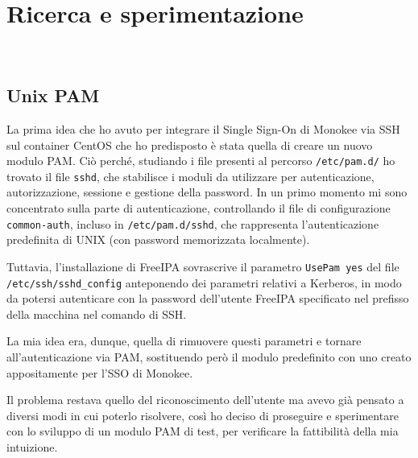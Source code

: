 
\chapter{Ricerca e sperimentazione}
\label{cap:ricerca-sperimentazione}

\\

\section{Unix PAM}
\label{sec:tecnologie-strumenti}

La prima idea che ho avuto per integrare il Single Sign-On di Monokee via SSH sul container CentOS che ho predisposto è stata quella di creare un nuovo modulo PAM. Ciò perché, studiando i file presenti al percorso \texttt{/etc/pam.d/} ho trovato il file \texttt{sshd}, che stabilisce i moduli da utilizzare per autenticazione, autorizzazione, sessione e gestione della password. In un primo momento mi sono concentrato sulla parte di autenticazione, controllando il file di configurazione \texttt{common-auth}, incluso in \texttt{/etc/pam.d/sshd}, che rappresenta l'autenticazione predefinita di UNIX (con password memorizzata localmente). 

Tuttavia, l'installazione di FreeIPA sovrascrive il parametro \texttt{UsePam yes} del file \texttt{/etc/ssh/sshd\_config} anteponendo dei parametri relativi a Kerberos, in modo da potersi autenticare con la password dell'utente FreeIPA specificato nel prefisso della macchina nel comando di SSH.

La mia idea era, dunque, quella di rimuovere questi parametri e tornare all'autenticazione via PAM, sostituendo però il modulo predefinito con uno creato appositamente per l'SSO di Monokee.

Il problema restava quello del riconoscimento dell'utente ma avevo già pensato a diversi modi in cui poterlo risolvere, così ho deciso di proseguire e sperimentare con lo sviluppo di un modulo PAM di test, per verificare la fattibilità della mia intuizione.

